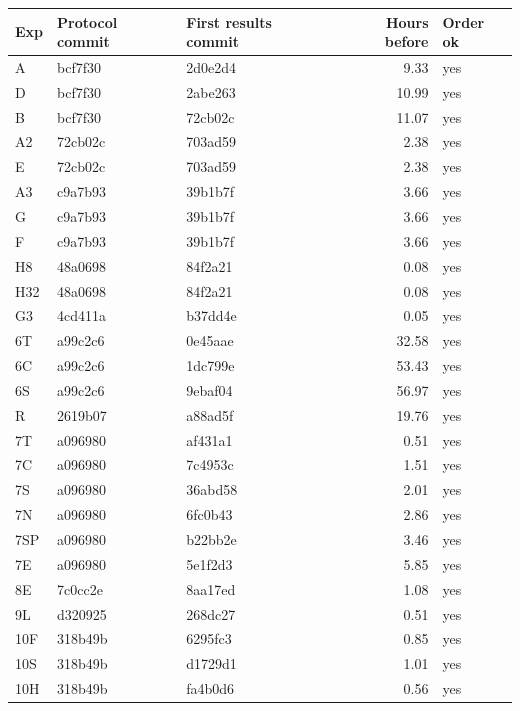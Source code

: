 \begin{tabular}{lllrl}
\toprule
Exp & Protocol commit & First results commit & Hours before & Order ok \\
\midrule
A & bcf7f30 & 2d0e2d4 & 9.33 & yes \\
D & bcf7f30 & 2abe263 & 10.99 & yes \\
B & bcf7f30 & 72cb02c & 11.07 & yes \\
A2 & 72cb02c & 703ad59 & 2.38 & yes \\
E & 72cb02c & 703ad59 & 2.38 & yes \\
A3 & c9a7b93 & 39b1b7f & 3.66 & yes \\
G & c9a7b93 & 39b1b7f & 3.66 & yes \\
F & c9a7b93 & 39b1b7f & 3.66 & yes \\
H8 & 48a0698 & 84f2a21 & 0.08 & yes \\
H32 & 48a0698 & 84f2a21 & 0.08 & yes \\
G3 & 4cd411a & b37dd4e & 0.05 & yes \\
6T & a99c2c6 & 0e45aae & 32.58 & yes \\
6C & a99c2c6 & 1dc799e & 53.43 & yes \\
6S & a99c2c6 & 9ebaf04 & 56.97 & yes \\
R & 2619b07 & a88ad5f & 19.76 & yes \\
7T & a096980 & af431a1 & 0.51 & yes \\
7C & a096980 & 7c4953c & 1.51 & yes \\
7S & a096980 & 36abd58 & 2.01 & yes \\
7N & a096980 & 6fc0b43 & 2.86 & yes \\
7SP & a096980 & b22bb2e & 3.46 & yes \\
7E & a096980 & 5e1f2d3 & 5.85 & yes \\
8E & 7c0cc2e & 8aa17ed & 1.08 & yes \\
9L & d320925 & 268dc27 & 0.51 & yes \\
10F & 318b49b & 6295fc3 & 0.85 & yes \\
10S & 318b49b & d1729d1 & 1.01 & yes \\
10H & 318b49b & fa4b0d6 & 0.56 & yes \\
\bottomrule
\end{tabular}
